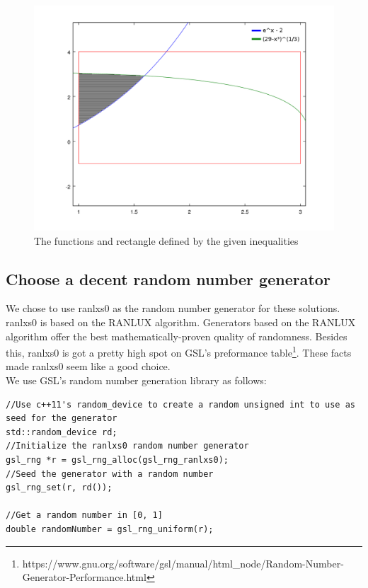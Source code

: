 \documentclass[11pt, a4paper, titlepage, openright]{article}
\begin{document}
        \begin{figure}[H]
            \begin{minipage}[b]{0.49\textwidth}
                \includegraphics[width=12cm]{../images/rectangle}
            \end{minipage}
            \caption{The functions and rectangle defined by the given inequalities}
	        \label{fig:rect}
        \end{figure}
    
    \subsection{Choose a decent random number generator}
        We chose to use ranlxs0 as the random number generator for these solutions. ranlxs0 is based on the RANLUX algorithm. Generators based on the RANLUX
        algorithm offer the best mathematically-proven quality of randomness. Besides this, ranlxs0 is got a pretty high spot on GSL's preformance table\footnote{https://www.gnu.org/software/gsl/manual/html\_node/Random-Number-Generator-Performance.html}.
        These facts made ranlxs0 seem like a good choice. \\
        We use GSL's random number generation library as follows:
        
\noindent
\begin{minipage}{\linewidth}
\begin{lstlisting}
//Use c++11's random_device to create a random unsigned int to use as seed for the generator
std::random_device rd;
//Initialize the ranlxs0 random number generator
gsl_rng *r = gsl_rng_alloc(gsl_rng_ranlxs0);
//Seed the generator with a random number
gsl_rng_set(r, rd());

//Get a random number in [0, 1]
double randomNumber = gsl_rng_uniform(r);
\end{lstlisting}
\end{minipage}
    
\end{document}
